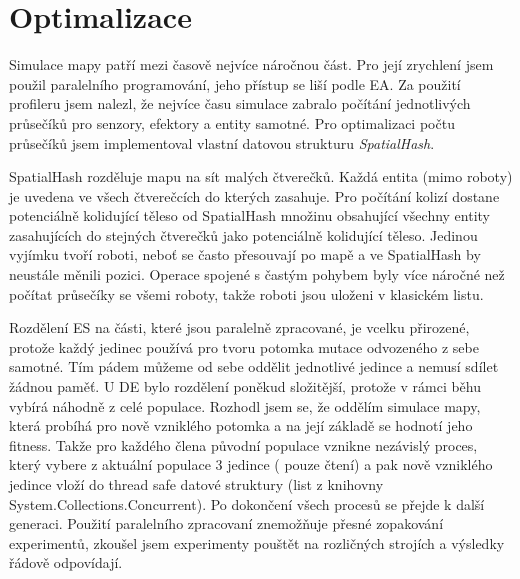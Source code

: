 \section*{Optimalizace}
Simulace mapy patří mezi časově nejvíce náročnou část. Pro její zrychlení jsem použil paralelního programování, jeho přístup se liší podle EA. Za použití profileru jsem nalezl, že nejvíce času simulace zabralo počítání jednotlivých průsečíků pro senzory, efektory a entity samotné. Pro optimalizaci počtu průsečíků jsem implementoval vlastní datovou strukturu \textit{SpatialHash}. 
\par 
SpatialHash rozděluje mapu na sít malých čtverečků. Každá entita (mimo roboty) je uvedena ve všech čtverečcích do kterých zasahuje. Pro počítání kolizí dostane potenciálně kolidující těleso od SpatialHash množinu obsahující všechny entity zasahujících do stejných čtverečků jako potenciálně kolidující těleso. Jedinou vyjímku tvoří roboti, neboť se často přesouvají po mapě a ve SpatialHash by neustále měnili pozici. Operace spojené s častým pohybem byly více náročné než počítat průsečíky se všemi roboty, takže roboti jsou uloženi v klasickém listu.
\par
Rozdělení ES na části, které jsou paralelně zpracované, je vcelku přirozené, protože každý jedinec používá pro tvoru potomka mutace odvozeného z sebe samotné. Tím pádem můžeme od sebe oddělit jednotlivé jedince a nemusí sdílet žádnou paměť. U DE bylo rozdělení poněkud složitější, protože v rámci běhu vybírá náhodně z celé populace. Rozhodl jsem se, že oddělím simulace mapy, která probíhá pro nově vzniklého potomka a na její základě se hodnotí jeho fitness. Takže pro každého člena původní populace vznikne nezávislý proces, který vybere z aktuální populace 3 jedince ( pouze čtení) a pak nově vzniklého jedince vloží do thread safe datové struktury (list z knihovny System.Collections.Concurrent). Po dokončení všech procesů se přejde k další generaci.  Použití paralelního zpracovaní znemožňuje přesné zopakování experimentů, zkoušel jsem experimenty pouštět na rozličných strojích a výsledky řádově odpovídají.  
